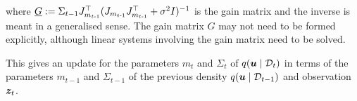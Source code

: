 \noindent where \( \emph{G} := \Sigma_{t-1}J_{m_{t{\operatorname{-}}1}}^\top (J_{m_{t{\operatorname{-}}1}} J_{m_{t{\operatorname{-}}1}}^\top + \sigma^2 I)^{-1} \) is the gain matrix and the inverse is meant in a generalised sense. 
The gain matrix $G$ may not need to be formed explicitly, although linear systems involving the gain matrix need to be solved.

This gives an update for the parameters $m_t$ and $\Sigma_t$ of $q(\boldsymbol{u} \mid \mathcal{D}_t)$ in terms of the parameters $m_{t-1}$ and $\Sigma_{t-1}$ of the previous density $q(\boldsymbol{u} \mid \mathcal{D}_{t-1})$ and observation $\boldsymbol{z}_t$.

